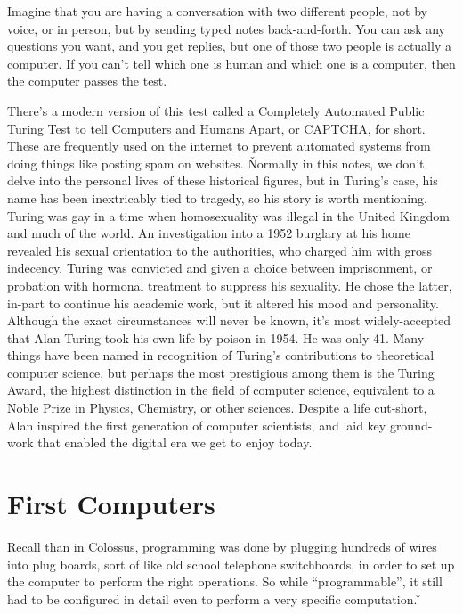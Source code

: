 \be
Imagine that you are having a conversation with two different people, not by voice, or in person, but by sending
typed notes back-and-forth. You can ask any questions you want, and you get replies, but one of those two people is
actually a computer. If you can't tell which one is human and which one is a computer, then the computer passes the
test.
\ee

There's a modern version of this test called a Completely Automated Public Turing Test to tell Computers and Humans
Apart, or CAPTCHA, for short. These are frequently used on the internet to prevent automated systems from doing
things like posting spam on websites. \v

Normally in this notes, we don't delve into the personal lives of these historical figures, but in Turing's case, his
name has been inextricably tied to tragedy, so his story is worth mentioning. Turing was gay in a time when
homosexuality was illegal in the United Kingdom and much of the world. An investigation into a 1952 burglary at his
home revealed his sexual orientation to the authorities, who charged him with gross indecency. Turing was convicted
and given a choice between imprisonment, or probation with hormonal treatment to suppress his sexuality. He chose the
latter, in-part to continue his academic work, but it altered his mood and personality. Although the exact
circumstances will never be known, it's most widely-accepted that Alan Turing took his own life by poison in 1954. He
was only 41. \v

Many things have been named in recognition of Turing's contributions to theoretical computer science, but perhaps the
most prestigious among them is the Turing Award, the highest distinction in the field of computer science, equivalent
to a Noble Prize in Physics, Chemistry, or other sciences. Despite a life cut-short, Alan inspired the first
generation of computer scientists, and laid key ground-work that enabled the digital era we get to enjoy today.

\section{First Computers}

Recall than in Colossus, programming was done by plugging hundreds of wires into plug boards, sort of like old school
telephone switchboards, in order to set up the computer to perform the right operations. So while ``programmable'',
it still had to be configured in detail even to perform a very specific computation. \v

